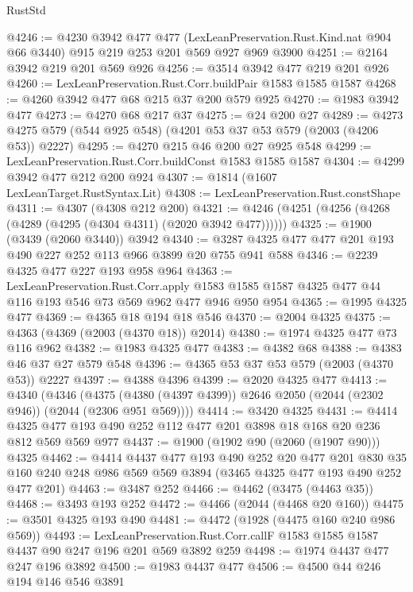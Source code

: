 \begin{lexlean}{RustStd}
\begin{coremodule}
{\begin{coremodule}
{{{{{{{{{{{{{{@4246 := @4230
    @3942
    @477
    @477
    (LexLeanPreservation.Rust.Kind.nat @904 @66 @3440)
    @915
    @219
    @253
    @201
    @569
    @927
    @969
    @3900
@4251 := @2164 @3942 @219 @201 @569 @926
@4256 := @3514 @3942 @477 @219 @201 @926
@4260 := LexLeanPreservation.Rust.Corr.buildPair @1583 @1585 @1587
@4268 := @4260 @3942 @477 @68 @215 @37 @200 @579 @925
@4270 := @1983 @3942 @477
@4273 := @4270 @68 @217 @37
@4275 := @24 @200 @27
@4289 := @4273 @4275 @579 (@544 @925 @548) (@4201 @53 @37 @53 @579 (@2003 (@4206 @53)) @2227)
@4295 := @4270 @215 @46 @200 @27 @925 @548
@4299 := LexLeanPreservation.Rust.Corr.buildConst @1583 @1585 @1587
@4304 := @4299 @3942 @477 @212 @200 @924
@4307 := @1814 (@1607 LexLeanTarget.RustSyntax.Lit)
@4308 := LexLeanPreservation.Rust.constShape
@4311 := @4307 (@4308 @212 @200)
@4321 := @4246 (@4251 (@4256 (@4268 (@4289 (@4295 (@4304 @4311) (@2020 @3942 @477))))))
@4325 := @1900 (@3439 (@2060 @3440)) @3942
@4340 := @3287 @4325 @477 @477 @201 @193 @490 @227 @252 @113 @966 @3899 @20 @755 @941 @588
@4346 := @2239 @4325 @477 @227 @193 @958 @964
@4363 := LexLeanPreservation.Rust.Corr.apply
    @1583
    @1585
    @1587
    @4325
    @477
    @44
    @116
    @193
    @546
    @73
    @569
    @962
    @477
    @946
    @950
    @954
@4365 := @1995 @4325 @477
@4369 := @4365 @18 @194 @18 @546
@4370 := @2004 @4325
@4375 := @4363 (@4369 (@2003 (@4370 @18)) @2014)
@4380 := @1974 @4325 @477 @73 @116 @962
@4382 := @1983 @4325 @477
@4383 := @4382 @68
@4388 := @4383 @46 @37 @27 @579 @548
@4396 := @4365 @53 @37 @53 @579 (@2003 (@4370 @53)) @2227
@4397 := @4388 @4396
@4399 := @2020 @4325 @477
@4413 := @4340
    (@4346 (@4375 (@4380 (@4397 @4399)) @2646 @2050 (@2044 (@2302 @946)) (@2044 (@2306 @951 @569))))
@4414 := @3420 @4325
@4431 := @4414 @4325 @477 @193 @490 @252 @112 @477 @201 @3898 @18 @168 @20 @236 @812 @569 @569 @977
@4437 := @1900 (@1902 @90 (@2060 (@1907 @90))) @4325
@4462 := @4414
    @4437
    @477
    @193
    @490
    @252
    @20
    @477
    @201
    @830
    @35
    @160
    @240
    @248
    @986
    @569
    @569
    @3894
    (@3465 @4325 @477 @193 @490 @252 @477 @201)
@4463 := @3487 @252
@4466 := @4462 (@3475 (@4463 @35))
@4468 := @3493 @193 @252
@4472 := @4466 (@2044 (@4468 @20 @160))
@4475 := @3501 @4325 @193 @490
@4481 := @4472 (@1928 (@4475 @160 @240 @986 @569))
@4493 := LexLeanPreservation.Rust.Corr.callF
    @1583
    @1585
    @1587
    @4437
    @90
    @247
    @196
    @201
    @569
    @3892
    @259
@4498 := @1974 @4437 @477 @247 @196 @3892
@4500 := @1983 @4437 @477
@4506 := @4500 @44 @246 @194 @146 @546 @3891
}}}}}}}}}}}}}}
\end{coremodule}}
\end{coremodule}
\end{lexlean}
